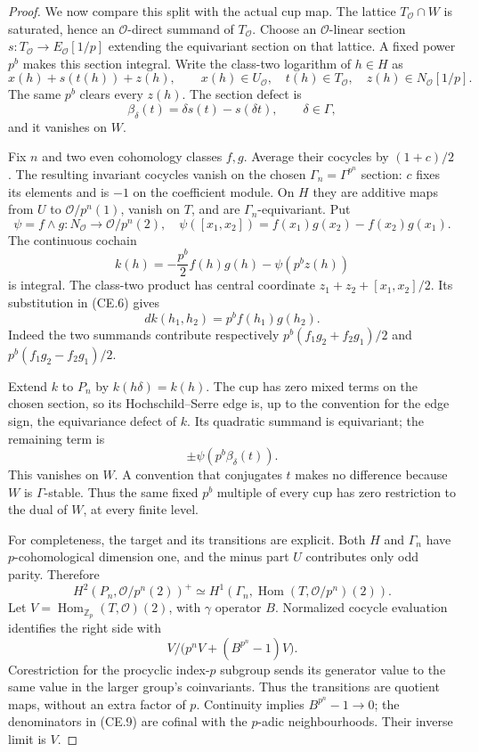 \documentclass[11pt,a4paper]{article}
\theoremstyle{definition}
\begin{document}
\begin{proof}
We now compare this split with the actual cup map. The lattice
$T_{\mathcal O}\cap W$ is saturated, hence an $\mathcal O$-direct
summand of $T_{\mathcal O}$. Choose an $\mathcal O$-linear section
$s:T_{\mathcal O}\to E_{\mathcal O}[1/p]$ extending the equivariant
section on that lattice. A fixed power $p^b$ makes this section
integral. Write the class-two logarithm of $h\in H$ as
\[
 x(h)+s(t(h))+z(h),\qquad
 x(h)\in U_{\mathcal O},\quad t(h)\in T_{\mathcal O},\quad
 z(h)\in N_{\mathcal O}[1/p].
\]
The same $p^b$ clears every $z(h)$. The section defect is
\[
 \beta_\delta(t)=\delta s(t)-s(\delta t),\qquad\delta\in\Gamma,
                                                               \tag{CE.5}
\]
and it vanishes on $W$.

Fix $n$ and two even cohomology classes $f,g$. Average their cocycles
by $(1+c)/2$. The resulting invariant cocycles vanish on the chosen
$\Gamma_n=\Gamma^{p^n}$ section: $c$ fixes its elements and is
$-1$ on the coefficient module. On $H$ they are additive maps
from $U$ to $\mathcal O/p^n(1)$, vanish on $T$, and are
$\Gamma_n$-equivariant. Put
\[
 \psi=f\wedge g:N_{\mathcal O}\longrightarrow\mathcal O/p^n(2),
 \quad
 \psi([x_1,x_2])=f(x_1)g(x_2)-f(x_2)g(x_1).
\]
The continuous cochain
\[
 k(h)=-\frac{p^b}{2}f(h)g(h)-\psi(p^b z(h))                    \tag{CE.6}
\]
is integral. The class-two product has central coordinate
$z_1+z_2+[x_1,x_2]/2$. Its substitution in (CE.6) gives
\[
 dk(h_1,h_2)=p^b f(h_1)g(h_2).
\]
Indeed the two summands contribute respectively
$p^b(f_1g_2+f_2g_1)/2$ and $p^b(f_1g_2-f_2g_1)/2$.

Extend $k$ to $P_n$ by $k(h\delta)=k(h)$. The cup has zero mixed
terms on the chosen section, so its Hochschild--Serre edge is, up
to the convention for the edge sign, the equivariance defect of
$k$. Its quadratic summand is equivariant; the remaining term is
\[
 \pm\psi(p^b\beta_\delta(t)).                               \tag{CE.7}
\]
This vanishes on $W$. A convention that conjugates $t$ makes no
difference because $W$ is $\Gamma$-stable. Thus the same fixed
$p^b$ multiple of every cup has zero restriction to the dual of
$W$, at every finite level.

For completeness, the target and its transitions are explicit.
Both $H$ and $\Gamma_n$ have $p$-cohomological dimension one,
and the minus part $U$ contributes only odd parity. Therefore
\[
 H^2(P_n,\mathcal O/p^n(2))^+
 \simeq H^1(\Gamma_n,\operatorname{Hom}(T,\mathcal O/p^n)(2)).
                                                               \tag{CE.8}
\]
Let $V=\operatorname{Hom}_{\mathbb Z_p}(T,\mathcal O)(2)$, with
$\gamma$ operator $B$. Normalized cocycle evaluation identifies
the right side with
\[
 V\big/\bigl(p^nV+(B^{p^n}-1)V\bigr).                         \tag{CE.9}
\]
Corestriction for the procyclic index-$p$ subgroup sends its
generator value to the same value in the larger group's
coinvariants. Thus the transitions are quotient maps, without an
extra factor of $p$. Continuity implies $B^{p^n}-1\to0$; the
denominators in (CE.9) are cofinal with the $p$-adic neighbourhoods.
Their inverse limit is $V$.


\end{proof}
\end{document}
